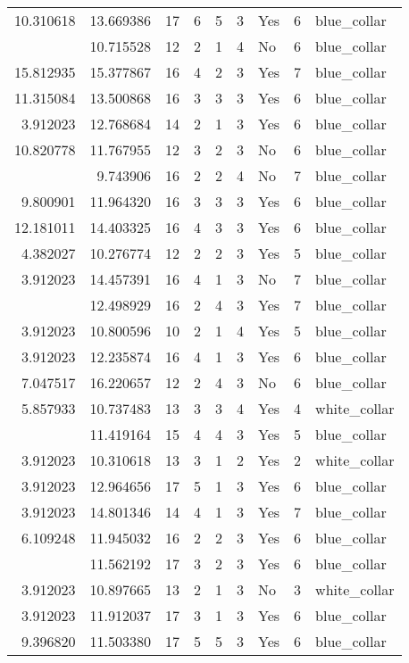 \documentclass[
]{article}
\begin{document}
\begin{longtable}[t]{rrrrrllrl}
10.310618 & 13.669386 & 17 & 6 & 5 & 3 & Yes & 6 & blue\_collar\\
\addlinespace
3.912023 & 10.715528 & 12 & 2 & 1 & 4 & No & 6 & blue\_collar\\
15.812935 & 15.377867 & 16 & 4 & 2 & 3 & Yes & 7 & blue\_collar\\
11.315084 & 13.500868 & 16 & 3 & 3 & 3 & Yes & 6 & blue\_collar\\
3.912023 & 12.768684 & 14 & 2 & 1 & 3 & Yes & 6 & blue\_collar\\
10.820778 & 11.767955 & 12 & 3 & 2 & 3 & No & 6 & blue\_collar\\
\addlinespace
6.620073 & 9.743906 & 16 & 2 & 2 & 4 & No & 7 & blue\_collar\\
9.800901 & 11.964320 & 16 & 3 & 3 & 3 & Yes & 6 & blue\_collar\\
12.181011 & 14.403325 & 16 & 4 & 3 & 3 & Yes & 6 & blue\_collar\\
4.382027 & 10.276774 & 12 & 2 & 2 & 3 & Yes & 5 & blue\_collar\\
3.912023 & 14.457391 & 16 & 4 & 1 & 3 & No & 7 & blue\_collar\\
\addlinespace
11.918724 & 12.498929 & 16 & 2 & 4 & 3 & Yes & 7 & blue\_collar\\
3.912023 & 10.800596 & 10 & 2 & 1 & 4 & Yes & 5 & blue\_collar\\
3.912023 & 12.235874 & 16 & 4 & 1 & 3 & Yes & 6 & blue\_collar\\
7.047517 & 16.220657 & 12 & 2 & 4 & 3 & No & 6 & blue\_collar\\
5.857933 & 10.737483 & 13 & 3 & 3 & 4 & Yes & 4 & white\_collar\\
\addlinespace
6.956545 & 11.419164 & 15 & 4 & 4 & 3 & Yes & 5 & blue\_collar\\
3.912023 & 10.310618 & 13 & 3 & 1 & 2 & Yes & 2 & white\_collar\\
3.912023 & 12.964656 & 17 & 5 & 1 & 3 & Yes & 6 & blue\_collar\\
3.912023 & 14.801346 & 14 & 4 & 1 & 3 & Yes & 7 & blue\_collar\\
6.109248 & 11.945032 & 16 & 2 & 2 & 3 & Yes & 6 & blue\_collar\\
\addlinespace
7.843849 & 11.562192 & 17 & 3 & 2 & 3 & Yes & 6 & blue\_collar\\
3.912023 & 10.897665 & 13 & 2 & 1 & 3 & No & 3 & white\_collar\\
3.912023 & 11.912037 & 17 & 3 & 1 & 3 & Yes & 6 & blue\_collar\\
9.396820 & 11.503380 & 17 & 5 & 5 & 3 & Yes & 6 & blue\_collar\\

\end{longtable}
\end{document}
